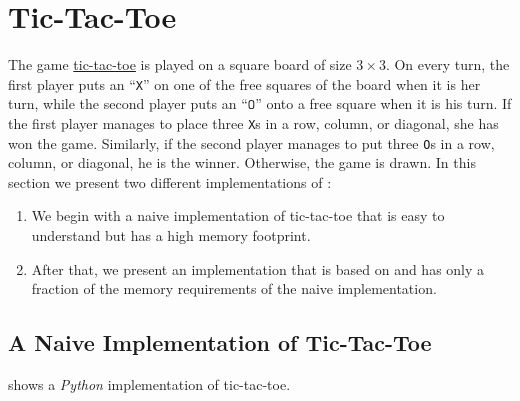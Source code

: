 \section{Tic-Tac-Toe}
The game \href{https://en.wikipedia.org/wiki/Tic-tac-toe}{tic-tac-toe} is played on a square board of size 
$3 \times 3$.  On every turn, the first player puts an ``\texttt{X}'' on one of the free squares of the board
when it is her turn, while
the second player puts an ``$\texttt{O}$'' onto a free square when it is his turn.  If the first player manages
to place three \texttt{X}s in a row, column, or diagonal, she has won the game.  Similarly, if the second
player manages to put three \texttt{O}s in a row, column, or diagonal, he is the winner.  Otherwise,
the game is drawn.  In this section we present two different implementations of :
\begin{enumerate}
\item We begin with a naive implementation of tic-tac-toe that is easy to understand but has a high memory
      footprint.
\item After that, we present an implementation that is based on  and has only a fraction of the
      memory requirements of the naive implementation.  
\end{enumerate}

\subsection{A Naive Implementation of Tic-Tac-Toe}
 shows a \textsl{Python} implementation of tic-tac-toe.


